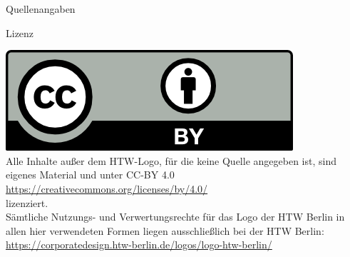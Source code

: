 \documentclass[aspectratio=169,t]{beamer}
\begin{document}
\begin{frame}[allowframebreaks]{Quellenangaben}
    \printbibliography
\end{frame}

\begin{frame}{Lizenz}
    \begin{center}
        \includegraphics{Bilder/by.png}\\
        Alle Inhalte außer dem HTW-Logo, für die keine Quelle angegeben ist, sind eigenes Material und unter CC-BY 4.0\\
        \url{https://creativecommons.org/licenses/by/4.0/}\\
        lizenziert.\\\vspace{0.5cm}
        Sämtliche Nutzungs- und Verwertungsrechte für das Logo der HTW Berlin in allen hier verwendeten Formen liegen ausschließlich bei der HTW Berlin:\\
        \url{https://corporatedesign.htw-berlin.de/logos/logo-htw-berlin/}
    \end{center}
\end{frame}
\end{document}
